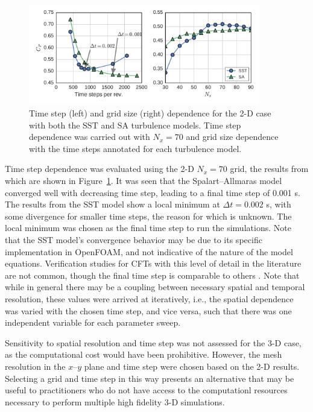 \documentclass[aip,graphicx]{revtex4-1}
\begin{document}
\begin{figure}
    \centering

    \includegraphics[width=0.9\textwidth]{verification}

    \caption{Time step (left) and grid size (right) dependence for the 2-D case
    with both the SST and SA turbulence models. Time step dependence was carried
    out with $N_x=70$ and grid size dependence with the time steps annotated for
    each turbulence model.}

    \label{fig:2d-br-verification}
\end{figure}

Time step dependence was evaluated using the 2-D $N_x=70$ grid, the results from
which are shown in Figure~\ref{fig:2d-br-verification}. It was seen that the
Spalart--Allmaras model converged well with decreasing time step, leading to a
final time step of 0.001 s. The results from the SST model show a local minimum
at $\Delta t = 0.002$ s, with some divergence for smaller time steps, the reason
for which is unknown. The local minimum was chosen as the final time step to run
the simulations. Note that the SST model's convergence behavior may be due to
its specific implementation in OpenFOAM, and not indicative of the nature of the
model equations. Verification studies for CFTs with this level of detail in the
literature are not common, though the final time step is comparable to others
\cite{Balduzzi2016}. Note that while in general there may be a coupling between
necessary spatial and temporal resolution, these values were arrived at
iteratively, i.e., the spatial dependence was varied with the chosen time step,
and vice versa, such that there was one independent variable for each parameter
sweep.

Sensitivity to spatial resolution and time step was not assessed for the 3-D
case, as the computational cost would have been prohibitive. However, the mesh
resolution in the $x$--$y$ plane and time step were chosen based on the 2-D
results. Selecting a grid and time step in this way presents an alternative that
may be useful to practitioners who do not have access to the computationl
resources necessary to perform multiple high fidelity 3-D simulations.
\end{document}
